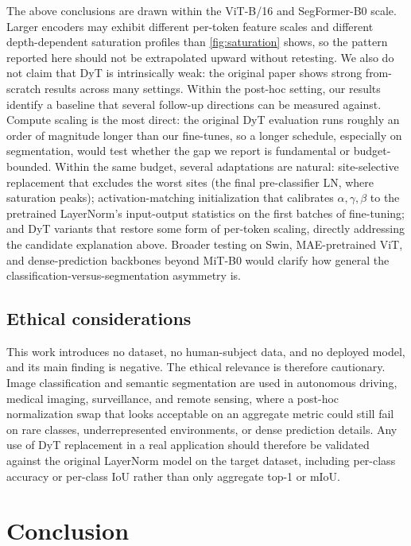 \documentclass[10pt,twocolumn,letterpaper]{article}
\begin{document}
The above conclusions are drawn within the ViT-B/16 and SegFormer-B0 scale. Larger encoders may exhibit different per-token feature scales and different depth-dependent saturation profiles than \cref{fig:saturation} shows, so the pattern reported here should not be extrapolated upward without retesting. We also do not claim that DyT is intrinsically weak: the original paper shows strong from-scratch results across many settings. Within the post-hoc setting, our results identify a baseline that several follow-up directions can be measured against. Compute scaling is the most direct: the original DyT evaluation runs roughly an order of magnitude longer than our fine-tunes, so a longer schedule, especially on segmentation, would test whether the gap we report is fundamental or budget-bounded. Within the same budget, several adaptations are natural: site-selective replacement that excludes the worst sites (the final pre-classifier LN, where saturation peaks); activation-matching initialization that calibrates $\alpha, \gamma, \beta$ to the pretrained LayerNorm's input-output statistics on the first batches of fine-tuning; and DyT variants that restore some form of per-token scaling, directly addressing the candidate explanation above. Broader testing on Swin, MAE-pretrained ViT, and dense-prediction backbones beyond MiT-B0 would clarify how general the classification-versus-segmentation asymmetry is.

\subsection{Ethical considerations}
\label{subsec:ethics}

This work introduces no dataset, no human-subject data, and no deployed model, and its main finding is negative. The ethical relevance is therefore cautionary. Image classification and semantic segmentation are used in autonomous driving, medical imaging, surveillance, and remote sensing, where a post-hoc normalization swap that looks acceptable on an aggregate metric could still fail on rare classes, underrepresented environments, or dense prediction details. Any use of DyT replacement in a real application should therefore be validated against the original LayerNorm model on the target dataset, including per-class accuracy or per-class IoU rather than only aggregate top-1 or mIoU.

\section{Conclusion}
\label{sec:conclusion}
\end{document}
